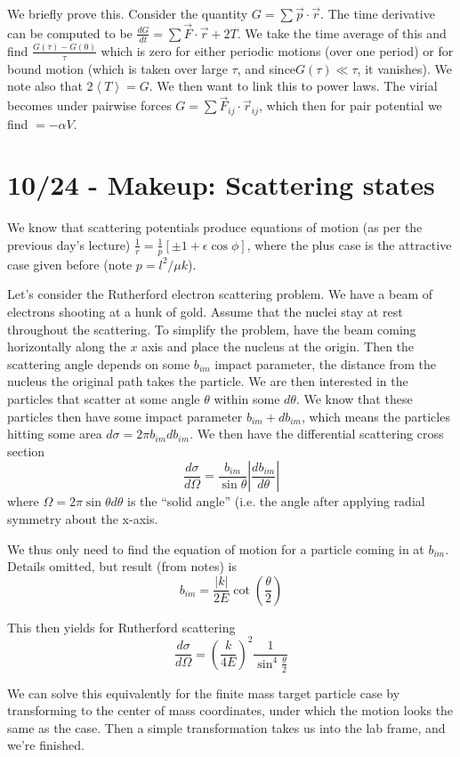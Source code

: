 \documentclass[10pt]{report}
\newcommand{\rd}[2]{\frac{d#1}{d#2}}
\newcommand{\abs}[1]{\left|#1\right|}
\newcommand{\expvalue}[1]{\left<#1\right>}
\begin{document}
We briefly prove this. Consider the quantity $G = \sum \vec{p} \cdot \vec{r}$. The time derivative can be computed to be $\rd{G}{t} = \sum \vec{F} \cdot \vec{r} + 2T$. We take the time average of this and find $\frac{G(\tau) - G(0)}{\tau}$ which is zero for either periodic motions (over one period) or for bound motion (which is taken over large $\tau$, and since$G(\tau) \ll \tau$, it vanishes). We note also that $2\expvalue{T} = G$. We then want to link this to power laws. The virial becomes under pairwise forces $G = \sum \vec{F}_{ij} \cdot \vec{r}_{ij}$, which then for pair potential we find $=-\alpha V$.

\chapter{10/24 - Makeup: Scattering states}

We know that scattering potentials produce equations of motion (as per the previous day's lecture) $\frac{1}{r} = \frac{1}{p}\left[\pm 1+\epsilon\cos \phi \right]$, where the plus case is the attractive case given before (note $p= l^2/\mu k$). 

Let's consider the Rutherford electron scattering problem. We have a beam of electrons shooting at a hunk of gold. Assume that the nuclei stay at rest throughout the scattering. To simplify the problem, have the beam coming horizontally along the $x$ axis and place the nucleus at the origin. Then the scattering angle depends on some $b_{im}$ impact parameter, the distance from the nucleus the original path takes the particle. We are then interested in the particles that scatter at some angle $\theta$ within some $d\theta$. We know that these particles then have some impact parameter $b_{im} + db_{im}$, which means the particles hitting some area $d\sigma = 2\pi b_{im} db_{im}$. We then have the differential scattering cross section
$$\rd{\sigma}{\Omega} = \frac{b_{im}}{\sin \theta} \abs{\rd{b_{im}}{\theta}}$$
where $\Omega=2\pi \sin \theta d\theta$ is the ``solid angle'' (i.e. the angle after applying radial symmetry about the x-axis.

We thus only need to find the equation of motion for a particle coming in at $b_{im}$. Details omitted, but result (from notes) is
$$b_{im} = \frac{\abs{k}}{2E}\cot\left( \frac{\theta}{2} \right)$$

This then yields for Rutherford scattering 
$$\rd{\sigma}{\Omega} = \left( \frac{k}{4E} \right)^2 \frac{1}{\sin^4 \frac{\theta}{2}}$$

We can solve this equivalently for the finite mass target particle case by transforming to the center of mass coordinates, under which the motion looks the same as the case. Then a simple transformation takes us into the lab frame, and we're finished.
\end{document}
